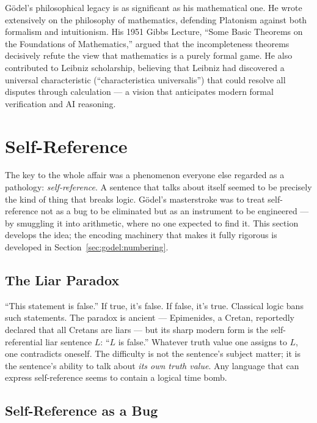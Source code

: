 Gödel's philosophical legacy is as significant as his mathematical one. He wrote extensively on the philosophy of mathematics, defending Platonism against both formalism and intuitionism. His 1951 Gibbs Lecture, ``Some Basic Theorems on the Foundations of Mathematics,'' argued that the incompleteness theorems decisively refute the view that mathematics is a purely formal game. He also contributed to Leibniz scholarship, believing that Leibniz had discovered a universal characteristic (``characteristica universalis'') that could resolve all disputes through calculation --- a vision that anticipates modern formal verification and AI reasoning.

\section{Self-Reference}
\label{sec:godel:selfref}

The key to the whole affair was a phenomenon everyone else regarded as a pathology: \emph{self-reference}. A sentence that talks about itself seemed to be precisely the kind of thing that breaks logic. Gödel's masterstroke was to treat self-reference not as a bug to be eliminated but as an instrument to be engineered --- by smuggling it into arithmetic, where no one expected to find it. This section develops the idea; the encoding machinery that makes it fully rigorous is developed in Section~\ref{sec:godel:numbering}.

\subsection{The Liar Paradox}
\label{sec:godel:liar}

``This statement is false.'' If true, it's false. If false, it's true. Classical logic bans such statements. The paradox is ancient --- Epimenides, a Cretan, reportedly declared that all Cretans are liars --- but its sharp modern form is the self-referential liar sentence $L$: ``$L$ is false.'' Whatever truth value one assigns to $L$, one contradicts oneself. The difficulty is not the sentence's subject matter; it is the sentence's ability to talk about \emph{its own truth value}. Any language that can express self-reference seems to contain a logical time bomb.

\subsection{Self-Reference as a Bug}
\label{sec:godel:selfref_bug}

